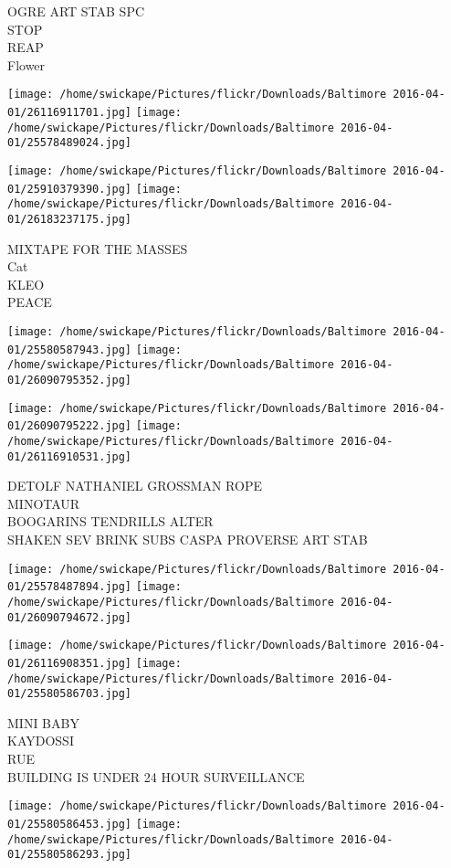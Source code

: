 \documentclass[10pt,letterpaper]{article}
\begin{document}
OGRE ART STAB SPC\\
STOP\\
REAP\\
Flower
\pagebreak

\texttt{[image: /home/swickape/Pictures/flickr/Downloads/Baltimore 2016-04-01/26116911701.jpg]}
\texttt{[image: /home/swickape/Pictures/flickr/Downloads/Baltimore 2016-04-01/25578489024.jpg]}

\texttt{[image: /home/swickape/Pictures/flickr/Downloads/Baltimore 2016-04-01/25910379390.jpg]}
\texttt{[image: /home/swickape/Pictures/flickr/Downloads/Baltimore 2016-04-01/26183237175.jpg]}

MIXTAPE FOR THE MASSES\\
Cat\\
KLEO\\
PEACE
\pagebreak

\texttt{[image: /home/swickape/Pictures/flickr/Downloads/Baltimore 2016-04-01/25580587943.jpg]}
\texttt{[image: /home/swickape/Pictures/flickr/Downloads/Baltimore 2016-04-01/26090795352.jpg]}

\texttt{[image: /home/swickape/Pictures/flickr/Downloads/Baltimore 2016-04-01/26090795222.jpg]}
\texttt{[image: /home/swickape/Pictures/flickr/Downloads/Baltimore 2016-04-01/26116910531.jpg]}

DETOLF NATHANIEL GROSSMAN ROPE\\
MINOTAUR\\
BOOGARINS TENDRILLS ALTER\\
SHAKEN SEV BRINK SUBS CASPA PROVERSE ART STAB
\pagebreak

\texttt{[image: /home/swickape/Pictures/flickr/Downloads/Baltimore 2016-04-01/25578487894.jpg]}
\texttt{[image: /home/swickape/Pictures/flickr/Downloads/Baltimore 2016-04-01/26090794672.jpg]}

\texttt{[image: /home/swickape/Pictures/flickr/Downloads/Baltimore 2016-04-01/26116908351.jpg]}
\texttt{[image: /home/swickape/Pictures/flickr/Downloads/Baltimore 2016-04-01/25580586703.jpg]}

MINI BABY\\
KAYDOSSI\\
RUE\\
BUILDING IS UNDER 24 HOUR SURVEILLANCE
\pagebreak

\texttt{[image: /home/swickape/Pictures/flickr/Downloads/Baltimore 2016-04-01/25580586453.jpg]}
\texttt{[image: /home/swickape/Pictures/flickr/Downloads/Baltimore 2016-04-01/25580586293.jpg]}
\end{document}
